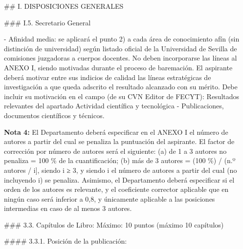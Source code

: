 \documentclass{article}
\begin{document}
\begin{itemize}
\begin{itemize}
\begin{scriptsize}
                  \#\# I. DISPOSICIONES GENERALES

                  \#\#\# I.5. Secretario General

                  - Afinidad media: se aplicará el punto 2) a cada área de conocimiento afín (sin distinción de universidad) según listado oficial de la Universidad de Sevilla de comisiones juzgadoras a cuerpos docentes. No deben incorporarse las líneas al ANEXO I, siendo motivadas durante el proceso de baremación. El aspirante deberá motivar entre sus indicios de calidad las líneas estratégicas de investigación a que queda adscrito el resultado alcanzado con su mérito. Debe incluir su motivación en el campo (de su CVN Editor de FECYT): Resultados relevantes del apartado Actividad científica y tecnológica - Publicaciones, documentos científicos y técnicos.

                  \textbf{Nota 4:} El Departamento deberá especificar en el ANEXO I el número de autores a partir del cual se penaliza la puntuación del aspirante. El factor de corrección por número de autores será el siguiente: (a) de 1 a 3 autores no penaliza = 100 \% de la cuantificación; (b) más de 3 autores = (100 \%) / (n.º autores / i], siendo i ≥ 3, y siendo i el número de autores a partir del cual (no incluyendo i) se penaliza. Asimismo, el Departamento deberá especificar si el orden de los autores es relevante, y el coeficiente corrector aplicable que en ningún caso será inferior a 0,8, y únicamente aplicable a las posiciones intermedias en caso de al menos 3 autores.

                  \#\#\# 3.3. Capítulos de Libro: Máximo: 10 puntos
                  (máximo 10 capítulos)

                  \#\#\#\# 3.3.1. Posición de la publicación:


\end{scriptsize}
\end{itemize}
\end{itemize}
\end{document}
